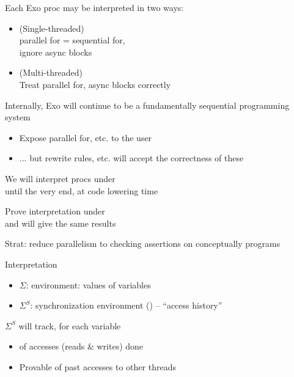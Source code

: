 \begin{minipage}[t]{0.46\textwidth}\fixminipage
Each Exo proc may be interpreted in two ways:
\begin{itemize}
  \item {} (Single-threaded)\\parallel for = sequential for,\\ignore async blocks
  \item {} (Multi-threaded)\\Treat parallel for, async blocks correctly
\end{itemize}

Internally, Exo will continue to be a fundamentally sequential programming system
\begin{itemize}
  \item Expose parallel for, etc. to the user
  \item ... but rewrite rules, etc. will accept the correctness of these 
\end{itemize}

We will interpret procs under \\until the very end, at code lowering time

\end{minipage}
\hfill
\begin{minipage}[t]{0.52\textwidth}\fixminipage
Prove interpretation under \\and {} will give the same results

Strat: reduce parallelism to checking assertions on conceptually  programs

Interpretation
\begin{itemize}
  \item $\Sigma$: environment:  values of variables
  \item $\Sigma^S$: synchronization environment () --  ``access history''
\end{itemize}
$\Sigma^S$ will track, for each variable
\begin{itemize}
  \item {} of accesses (reads \& writes) done
  \item Provable  of past accesses to other threads
\end{itemize}

\end{minipage}
\vfill
